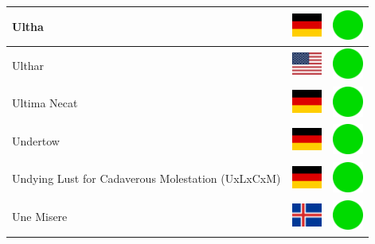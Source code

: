 \documentclass[12pt, a4paper, twoside]{report}
\begin{document}
\begin{center}
\begin{longtable}{|p{5cm}|p{2cm}|p{2cm}|}
 Ultha                                                      & \includegraphics[width=1cm]{../img/flags/de} &   \includegraphics[width=1cm]{../likes/y} \\ \hline
 Ulthar                                                     & \includegraphics[width=1cm]{../img/flags/us} &   \includegraphics[width=1cm]{../likes/y} \\ \hline
 Ultima Necat                                               & \includegraphics[width=1cm]{../img/flags/de} &   \includegraphics[width=1cm]{../likes/y} \\ \hline
 Undertow                                                   & \includegraphics[width=1cm]{../img/flags/de} &   \includegraphics[width=1cm]{../likes/y} \\ \hline
 Undying Lust for Cadaverous Molestation (UxLxCxM)          & \includegraphics[width=1cm]{../img/flags/de} &   \includegraphics[width=1cm]{../likes/y} \\ \hline
 Une Misere                                                 & \includegraphics[width=1cm]{../img/flags/is} &   \includegraphics[width=1cm]{../likes/y} \\ \hline

\end{longtable}
\end{center}
\end{document}
